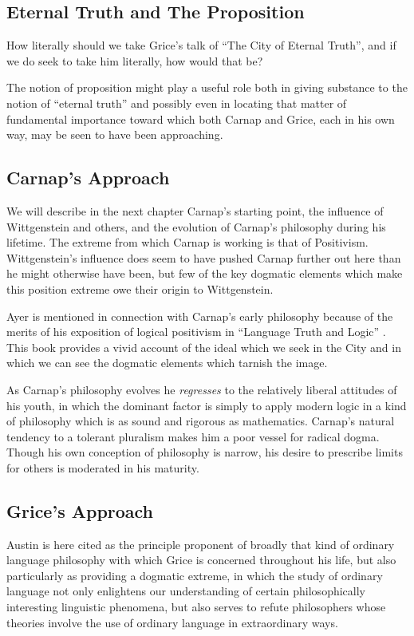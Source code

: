 \documentclass[10pt,titlepage]{book}
\begin{document}
\subsection{Eternal Truth and The Proposition}

How literally should we take Grice's talk of ``The City of Eternal Truth'', and if we do seek to take him literally, how would that be?

The notion of proposition might play a useful role both in giving substance to the notion of ``eternal truth'' and possibly even in locating that matter of fundamental importance toward which both Carnap and Grice, each in his own way, may be seen to have been approaching.

\subsection{Carnap's Approach}

We will describe in the next chapter Carnap's starting point, the influence of Wittgenstein and others, and the evolution of Carnap's philosophy during his lifetime.
The extreme from which Carnap is working is that of Positivism.
Wittgenstein's influence does seem to have pushed Carnap further out here than he might otherwise have been, but few of the key dogmatic elements which make this position extreme owe their origin to Wittgenstein.

Ayer is mentioned in connection with Carnap's early philosophy because of the merits of his exposition of logical positivism in ``Language Truth and Logic'' \cite{ayer1936}.
This book provides a vivid account of the ideal which we seek in the City and in which we can see the dogmatic elements which tarnish the image.

As Carnap's philosophy evolves he \emph{regresses} to the relatively liberal attitudes of his youth, in which the dominant factor is simply to apply modern logic in a kind of philosophy which is as sound and rigorous as mathematics.
Carnap's natural tendency to a tolerant pluralism makes him a poor vessel for radical dogma.
Though his own conception of philosophy is narrow, his desire to prescribe limits for others is moderated in his maturity.

\subsection{Grice's Approach}

Austin is here cited as the principle proponent of broadly that kind of ordinary language philosophy with which Grice is concerned throughout his life, but also particularly as providing a dogmatic extreme, in which the study of ordinary language not only enlightens our understanding of certain philosophically interesting linguistic phenomena, but also serves to refute philosophers whose theories involve the use of ordinary language in extraordinary ways.
\end{document}
